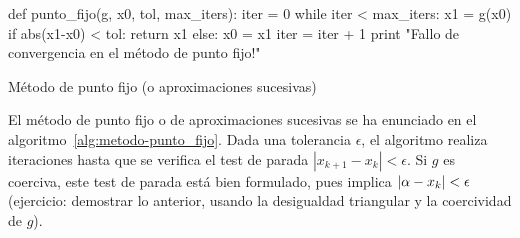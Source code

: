 \begin{algorithm}  \begin{python}
def punto_fijo(g, x0, tol, max_iters):
    iter = 0
    while iter < max_iters:
        x1 = g(x0)
        if abs(x1-x0) < tol: 
            return x1
        else:
            x0 = x1
            iter = iter + 1        
    print "Fallo de convergencia en el método de punto fijo!"
\end{python}
\caption{Método de punto fijo (o aproximaciones sucesivas)}
\label{alg:metodo-punto_fijo}
\end{algorithm}
El método de punto fijo o de aproximaciones sucesivas se ha enunciado
en el algoritmo~\ref{alg:metodo-punto_fijo}.  Dada una tolerancia
$\epsilon$, el algoritmo realiza iteraciones hasta que se verifica el
test de parada $|x_{k+1}-x_k|<\epsilon$. Si $g$ es coerciva, este test
de parada está bien formulado, pues implica $|\alpha-x_k|<\epsilon$
(ejercicio: demostrar lo anterior, usando la desigualdad triangular y
la coercividad de $g$).%

